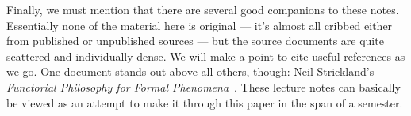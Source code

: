 Finally, we must mention that there are several good companions to these notes.  Essentially none of the material here is original --- it's almost all cribbed either from published or unpublished sources --- but the source documents are quite scattered and individually dense.  We will make a point to cite useful references as we go.  One document stands out above all others, though: Neil Strickland's \textit{Functorial Philosophy for Formal Phenomena}~\cite{StricklandFPFP}.  These lecture notes can basically be viewed as an attempt to make it through this paper in the span of a semester.
